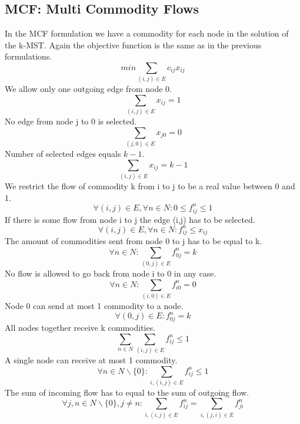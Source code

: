 \documentclass{article}
\begin{document}
\subsection{MCF: Multi Commodity Flows \label{mcf}}
In the MCF formulation we have a commodity for each node in the solution of the k-MST. Again the objective function is the same as in the previous formulations.
\setcounter{equation}{0}
\begin{equation}
min \sum_{(i,j) \in E} c_{ij} x_{ij}
\end{equation}
We allow only one outgoing edge from node 0.
\begin{equation}
\sum_{(i,j) \in E} x_{ij} = 1
\end{equation}
No edge from node j to 0 is selected.
\begin{equation}
\sum_{(j,0) \in E} x_{j0} = 0
\end{equation}
Number of selected edges equals $k-1$.
\begin{equation}
\sum_{(i,j) \in E} x_{ij} = k - 1
\end{equation}
We restrict the flow of commodity k from i to j to be a real value between 0 and 1.
\begin{equation}
\forall (i,j) \in E, \forall n \in N : 0 \le f_{ij}^{n} \le 1
\end{equation}
If there is some flow from node i to j the edge (i,j) has to be selected.
\begin{equation}
\forall (i,j) \in E, \forall n \in N : f_{ij}^{n} \le x_{ij} 
\end{equation}
The amount of commodities sent from node 0 to j has to be equal to k.
\begin{equation}
\forall n \in N: \sum_{(0,j) \in E} f_{0j}^{n} = k
\end{equation}
No flow is allowed to go back from node i to 0 in any case.
\begin{equation}
\forall n \in N: \sum_{(i,0) \in E} f_{i0}^{n} = 0
\end{equation}
Node 0 can send at most 1 commodity to a node.
\begin{equation}
\forall (0,j) \in E : f_{0j}^{n} = k
\end{equation}
All nodes together receive k commodities.
\begin{equation}
\sum_{n \in N} \sum_{(i,j) \in E} f_{ij}^{n} \le 1
\end{equation}
A single node can receive at most 1 commodity.
\begin{equation}
\forall n \in N \backslash \{0\} : \sum_{i,(i,j) \in E} f_{ij}^{n} \le 1
\end{equation}
The sum of incoming flow has to equal to the sum of outgoing flow.
\begin{equation}
\forall j,n \in N \backslash \{0\}, j \not= n : \sum_{i,(i,j) \in E} f_{ij}^{n} = \sum_{i,(j,i) \in E} f_{ji}^{n}
\end{equation}
\end{document}
